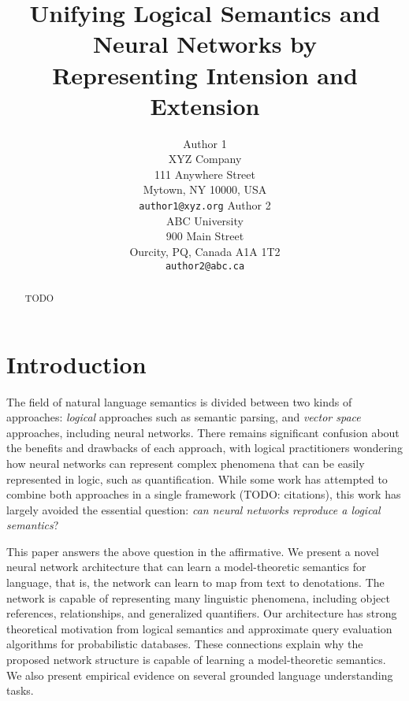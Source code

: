\documentclass[11pt,letterpaper]{article}
\title{Unifying Logical Semantics and Neural Networks by \\ Representing Intension and Extension}
\author{Author 1\\
	    XYZ Company\\
	    111 Anywhere Street\\
	    Mytown, NY 10000, USA\\
	    {\tt author1@xyz.org}
	  \And
	Author 2\\
  	ABC University\\
  	900 Main Street\\
  	Ourcity, PQ, Canada A1A 1T2\\
  {\tt author2@abc.ca}}
\date{}
\begin{document}
\maketitle
\begin{abstract}
TODO
\end{abstract}

\section{Introduction}

The field of natural language semantics is divided between two kinds
of approaches: \emph{logical} approaches such as semantic parsing, and
\emph{vector space} approaches, including neural networks. There remains
significant confusion about the benefits and drawbacks of each
approach, with logical practitioners wondering how neural networks can
represent complex phenomena that can be easily represented in logic,
such as quantification. While some work has attempted to combine both
approaches in a single framework (TODO: citations), this work has
largely avoided the essential question: \emph{can neural networks
reproduce a logical semantics}?


This paper answers the above question in the affirmative. We present a
novel neural network architecture that can learn a model-theoretic
semantics for language, that is, the network can learn to map from
text to denotations. The network is capable of representing many
linguistic phenomena, including object references, relationships, and
generalized quantifiers. Our architecture has strong theoretical
motivation from logical semantics and approximate query evaluation
algorithms for probabilistic databases. These connections explain why
the proposed network structure is capable of learning a
model-theoretic semantics. We also present empirical evidence on
several grounded language understanding tasks.

\end{document}
